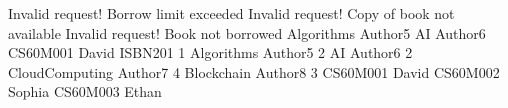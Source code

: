 Invalid request! Borrow limit exceeded
Invalid request! Copy of book not available
Invalid request! Book not borrowed
Algorithms Author5
AI Author6
CS60M001 David ISBN201 1
Algorithms Author5 2
AI Author6 2
CloudComputing Author7 4
Blockchain Author8 3
CS60M001 David
CS60M002 Sophia
CS60M003 Ethan